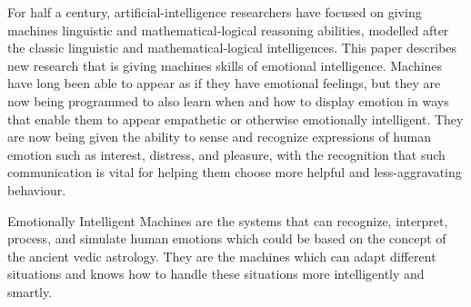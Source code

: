 For half a century, artificial-intelligence researchers have focused on giving machines linguistic and mathematical-logical reasoning abilities, modelled after the classic linguistic and mathematical-logical intelligences. This paper describes new research that is giving machines skills of emotional intelligence. Machines have long been able to appear as if they have emotional feelings, but they are now being programmed to also learn when and how to display emotion in ways that enable them to appear empathetic or otherwise emotionally intelligent. They are now being given the ability to sense and recognize expressions of human emotion such as interest, distress, and pleasure, with the recognition that such communication is vital for helping them choose more helpful and less-aggravating behaviour.

Emotionally Intelligent Machines are the systems that can recognize, interpret, process, and simulate human emotions which could be based on the concept of the ancient vedic astrology. They are the machines which can adapt different situations and knows how to handle these situations more intelligently and smartly.